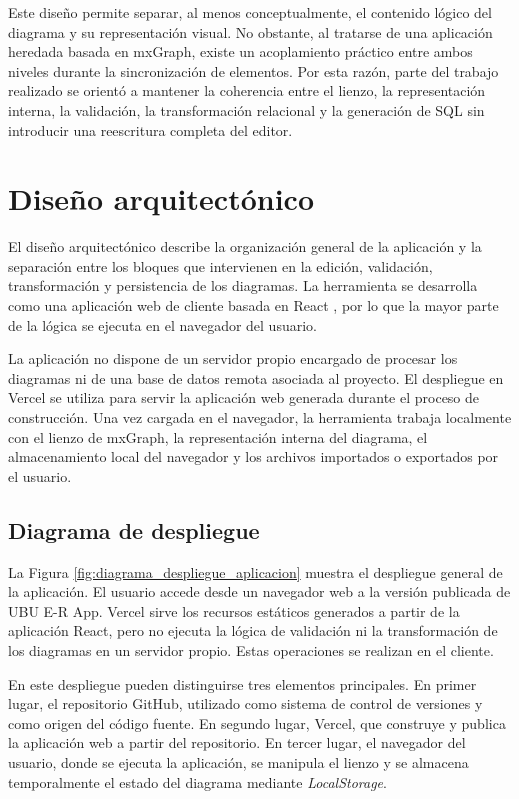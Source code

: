 Este diseño permite separar, al menos conceptualmente, el contenido lógico del diagrama y su representación visual. No obstante, al tratarse de una aplicación heredada basada en mxGraph, existe un acoplamiento práctico entre ambos niveles durante la sincronización de elementos. Por esta razón, parte del trabajo realizado se orientó a mantener la coherencia entre el lienzo, la representación interna, la validación, la transformación relacional y la generación de SQL sin introducir una reescritura completa del editor.

\section{Diseño arquitectónico}

El diseño arquitectónico describe la organización general de la aplicación y la separación entre los bloques que intervienen en la edición, validación, transformación y persistencia de los diagramas. La herramienta se desarrolla como una aplicación web de cliente basada en React \cite{react}, por lo que la mayor parte de la lógica se ejecuta en el navegador del usuario.

La aplicación no dispone de un servidor propio encargado de procesar los diagramas ni de una base de datos remota asociada al proyecto. El despliegue en Vercel se utiliza para servir la aplicación web generada durante el proceso de construcción. Una vez cargada en el navegador, la herramienta trabaja localmente con el lienzo de mxGraph, la representación interna del diagrama, el almacenamiento local del navegador y los archivos importados o exportados por el usuario.

\subsection{Diagrama de despliegue}

La Figura \ref{fig:diagrama_despliegue_aplicacion} muestra el despliegue general de la aplicación. El usuario accede desde un navegador web a la versión publicada de UBU E-R App. Vercel \cite{vercel} sirve los recursos estáticos generados a partir de la aplicación React, pero no ejecuta la lógica de validación ni la transformación de los diagramas en un servidor propio. Estas operaciones se realizan en el cliente.


En este despliegue pueden distinguirse tres elementos principales. En primer lugar, el repositorio GitHub, utilizado como sistema de control de versiones y como origen del código fuente. En segundo lugar, Vercel, que construye y publica la aplicación web a partir del repositorio. En tercer lugar, el navegador del usuario, donde se ejecuta la aplicación, se manipula el lienzo y se almacena temporalmente el estado del diagrama mediante \textit{LocalStorage}.

